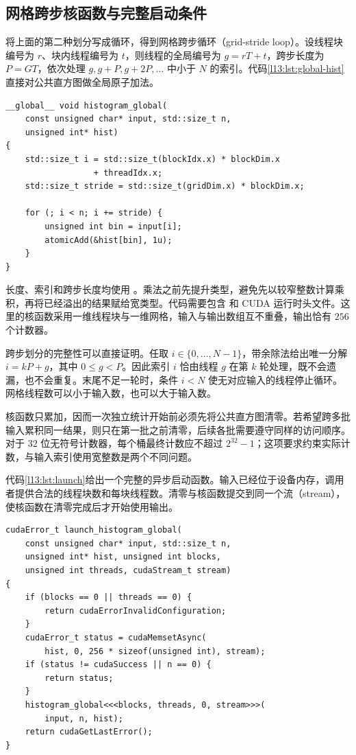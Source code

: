 \subsection{网格跨步核函数与完整启动条件}

将上面的第二种划分写成循环，得到网格跨步循环（grid-stride loop）。设线程块编号为 $r$、块内线程编号为 $t$，则线程的全局编号为 $g=rT+t$，跨步长度为 $P=GT$，依次处理 $g,g+P,g+2P,\ldots$ 中小于 $N$ 的索引。代码\ref{l13:lst:global-hist}直接对公共直方图做全局原子加法。

\noindent\begin{minipage}{\textwidth}
\begin{lstlisting}[caption={统计 256 种无符号字节值的基本核函数},label={l13:lst:global-hist}]
__global__ void histogram_global(
    const unsigned char* input, std::size_t n,
    unsigned int* hist)
{
    std::size_t i = std::size_t(blockIdx.x) * blockDim.x
                  + threadIdx.x;
    std::size_t stride = std::size_t(gridDim.x) * blockDim.x;

    for (; i < n; i += stride) {
        unsigned int bin = input[i];
        atomicAdd(&hist[bin], 1u);
    }
}
\end{lstlisting}
\end{minipage}

长度、索引和跨步长度均使用 \mbox{}。乘法之前先提升类型，避免先以较窄整数计算乘积，再将已经溢出的结果赋给宽类型。代码需要包含 \mbox{} 和 CUDA 运行时头文件。这里的核函数采用一维线程块与一维网格，输入与输出数组互不重叠，输出恰有 $256$ 个计数器。

跨步划分的完整性可以直接证明。任取 $i\in\{0,\ldots,N-1\}$，带余除法给出唯一分解 $i=kP+g$，其中 $0\le g<P$。因此索引 $i$ 恰由线程 $g$ 在第 $k$ 轮处理，既不会遗漏，也不会重复。末尾不足一轮时，条件 $i<N$ 使无对应输入的线程停止循环。网格线程数可以小于输入数，也可以大于输入数。

核函数只累加，因而一次独立统计开始前必须先将公共直方图清零。若希望跨多批输入累积同一结果，则只在第一批之前清零，后续各批需要遵守同样的访问顺序。对于 $32$ 位无符号计数器，每个桶最终计数应不超过 $2^{32}-1$；这项要求约束实际计数，与输入索引使用宽整数是两个不同问题。

代码\ref{l13:lst:launch}给出一个完整的异步启动函数。输入已经位于设备内存，调用者提供合法的线程块数和每块线程数。清零与核函数提交到同一个流（stream），使核函数在清零完成后才开始使用输出。

\noindent\begin{minipage}{\textwidth}
\begin{lstlisting}[caption={同一流中先清零再启动统计},label={l13:lst:launch}]
cudaError_t launch_histogram_global(
    const unsigned char* input, std::size_t n,
    unsigned int* hist, unsigned int blocks,
    unsigned int threads, cudaStream_t stream)
{
    if (blocks == 0 || threads == 0) {
        return cudaErrorInvalidConfiguration;
    }
    cudaError_t status = cudaMemsetAsync(
        hist, 0, 256 * sizeof(unsigned int), stream);
    if (status != cudaSuccess || n == 0) {
        return status;
    }
    histogram_global<<<blocks, threads, 0, stream>>>(
        input, n, hist);
    return cudaGetLastError();
}
\end{lstlisting}
\end{minipage}

